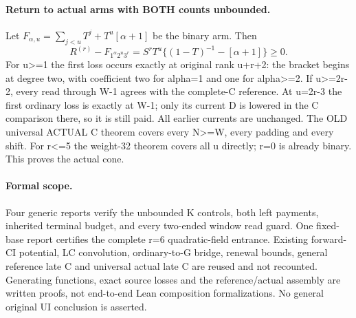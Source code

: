 \paragraph{Return to actual arms with BOTH counts unbounded.}
Let $F_{\alpha,u}=\sum_{j<u}T^j+T^u[\alpha+1]$ be the binary
arm. Then
\[
 R^{(r)}-F_{1^\alpha2^u3^r}
      =S^rT^u\{(1-T)^{-1}-[\alpha+1]\}\ge0.
\]
For u>=1 the first loss occurs exactly at original rank u+r+2:
the bracket begins at degree two, with coefficient two for alpha=1
and one for alpha>=2. If u>=2r-2, every read through W-1 agrees
with the complete-C reference. At u=2r-3 the first ordinary loss
is exactly at W-1; only its current D is lowered in the C comparison
there, so it is still paid. All earlier currents are unchanged.
The OLD universal ACTUAL C theorem covers every N>=W, every
padding and every shift. For r<=5 the weight-32 theorem covers
all u directly; r=0 is already binary. This proves the actual cone.

\paragraph{Formal scope.}
Four generic reports verify the unbounded K controls, both left
payments, inherited terminal budget, and every two-ended window
read guard. One fixed-base report certifies the complete r=6
quadratic-field entrance. Existing forward-CI potential, LC
convolution, ordinary-to-G bridge, renewal bounds, general reference
late C and universal actual late C are reused and not recounted.
Generating functions, exact source losses and the reference/actual
assembly are written proofs, not end-to-end Lean composition
formalizations. No general original UI conclusion is asserted.
